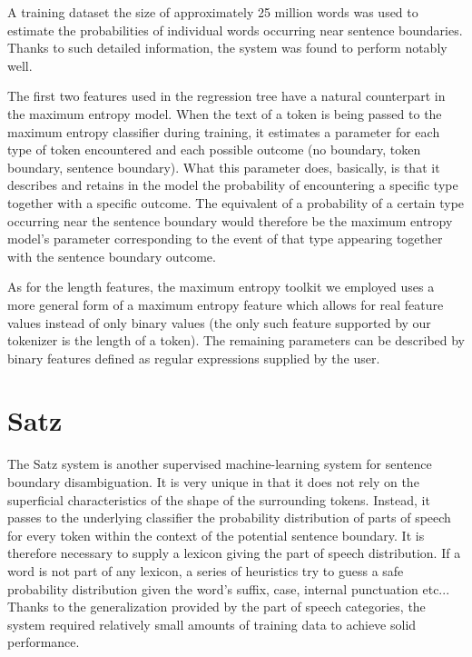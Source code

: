 A training dataset the size of approximately 25 million words was used to
estimate the probabilities of individual words occurring near sentence
boundaries. Thanks to such detailed information, the system was found to
perform notably well.

The first two features used in the regression tree have a natural counterpart
in the maximum entropy model. When the text of a token is being passed to the
maximum entropy classifier during training, it estimates a parameter for each
type of token encountered and each possible outcome (no boundary, token
boundary, sentence boundary). What this parameter does, basically, is that it
describes and retains in the model the probability of encountering a specific
type together with a specific outcome. The equivalent of a probability of a
certain type occurring near the sentence boundary would therefore be the
maximum entropy model's parameter corresponding to the event of that type
appearing together with the sentence boundary outcome.

As for the length features, the maximum entropy toolkit we employed uses a more
general form of a maximum entropy feature which allows for real feature values
instead of only binary values (the only such feature supported by our tokenizer
is the length of a token). The remaining parameters can be described by binary
features defined as regular expressions supplied by the user.

\section{Satz}
\label{sec:survey-satz}

The Satz system \cite{sbd-satz} is another supervised machine-learning system
for sentence boundary disambiguation. It is very unique in that it does not
rely on the superficial characteristics of the shape of the surrounding
tokens. Instead, it passes to the underlying classifier the probability
distribution of parts of speech for every token within the context of the
potential sentence boundary. It is therefore necessary to supply a lexicon
giving the part of speech distribution. If a word is not part of any lexicon,
a series of heuristics try to guess a safe probability distribution given the
word's suffix, case, internal punctuation etc... Thanks to the generalization
provided by the part of speech categories, the system required relatively
small amounts of training data to achieve solid performance. 

